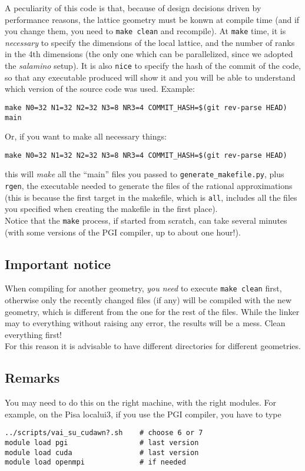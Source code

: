 A peculiarity of this code is that, because of design decisions driven by 
performance reasons, the lattice geometry must be konwn at compile time (and 
if you change them, you need to \verb|make clean| and recompile). At \verb|make|
time, it is \emph{necessary} to  specify the dimensions of the local lattice, 
and the number of ranks in the 4th dimensions (the only one which can be 
parallelized, since we adopted the \emph{salamino} setup). It is also 
\verb|nice| to specify the hash of the commit of the code, so that any 
executable produced will show it and you will be able to understand which 
version of the source code was used. Example:
\begin{verbatim}
make N0=32 N1=32 N2=32 N3=8 NR3=4 COMMIT_HASH=$(git rev-parse HEAD) main
\end{verbatim}
Or, if you want to make all necessary things:
\begin{verbatim}
make N0=32 N1=32 N2=32 N3=8 NR3=4 COMMIT_HASH=$(git rev-parse HEAD) 
\end{verbatim}
this will \emph{make} all the ``main'' files you passed to 
\verb|generate_makefile.py|, plus \verb|rgen|, the executable needed to 
generate the files of the rational approximations (this is because the first 
target in the makefile, which is \verb|all|, includes all the files you 
specified when creating the makefile in the first place).\\
Notice that the \verb|make| process, if started from scratch, can take several 
minutes (with some versions of the PGI compiler, up to about one hour!).

\subsection{Important notice}

When compiling for another geometry, \emph{you need} to execute 
\verb|make clean| first, otherwise only the recently changed files  (if 
any) will be 
compiled with the new geometry, which is different from the one for the rest of 
the files. While 
the linker may to everything without raising any error, the results will be a 
mess. Clean everything first!\\

For this reason it is advisable to have different directories for different 
geometries.

\subsection{Remarks} 
You may need to do this on the right machine, with the right modules.
For example, on the Pisa localui3, if you use the PGI compiler,
you have to type
\begin{verbatim}
../scripts/vai_su_cudawn?.sh    # choose 6 or 7
module load pgi                 # last version
module load cuda                # last version
module load openmpi             # if needed 
\end{verbatim}




